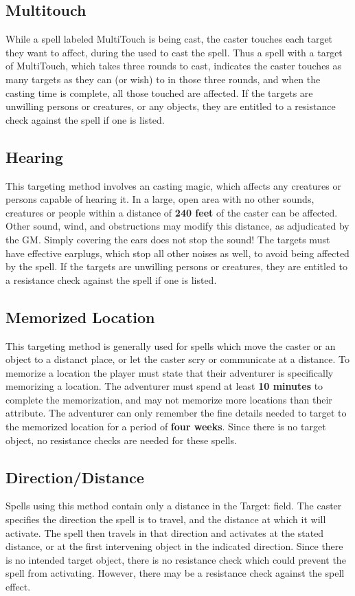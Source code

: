 \begin{multicols*}{2}
\subsection{Multitouch}
 While a spell labeled MultiTouch is being cast, the caster touches each target they want to affect, during the  used to cast the spell. Thus a spell with a target of MultiTouch, which takes three rounds to cast, indicates the caster touches as many targets as they can (or wish) to in those three rounds, and when the casting time is complete, all those touched are affected. If the targets are unwilling persons or creatures, or any objects, they are entitled to a resistance check against the spell if one is listed.
\subsection{Hearing}
 This targeting method involves an  casting magic, which affects any creatures or persons capable of hearing it. In a large, open area with no other sounds,  creatures or people within a distance of \textbf{240 feet} of the caster can be affected. Other sound, wind, and obstructions may modify this distance, as adjudicated by the GM. Simply covering the ears does not stop the sound! The targets must have effective earplugs, which stop all other noises as well, to avoid being affected by the spell. If the targets are unwilling persons or creatures, they are entitled to a resistance check against the spell if one is listed.
\subsection{Memorized Location}
 This targeting method is generally used for spells which move the caster or an object to a distanct place, or let the caster scry or communicate at a distance. To memorize a location the player must state that their adventurer is specifically memorizing a location. The adventurer must spend at least \textbf{10 minutes} to complete the memorization, and may not memorize more locations than their \INT attribute. The adventurer can only remember the fine details needed to target to the memorized location for a period of \textbf{four weeks}. Since there is no target object, no resistance checks are needed for these spells.
\subsection{Direction/Distance}
 Spells using this method contain only a distance in the Target: field. The caster specifies the direction the spell is to travel, and the distance at which it will activate. The spell then travels in that direction and activates at the stated distance, or at the first intervening object in the indicated direction. Since there is no intended target object, there is no resistance check which could prevent the spell from activating. However, there may be a resistance check against the spell effect.

\end{multicols*}
